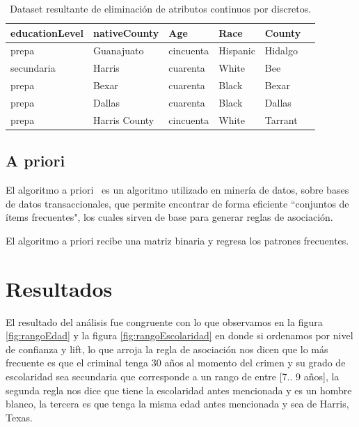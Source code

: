 \documentclass[sigconf]{acmart}
\begin{document}
\begin{table}[hbt]
\begin{center}
\begin{tabular}{llllll}
\toprule
educationLevel &   nativeCounty &        Age &      Race &   County \\
\midrule
         prepa &     Guanajuato &  cincuenta &  Hispanic &  Hidalgo \\
     secundaria &         Harris &   cuarenta &     White &      Bee \\
         prepa &          Bexar &   cuarenta &     Black &    Bexar \\
         prepa &         Dallas &   cuarenta &     Black &   Dallas \\
        prepa &  Harris County &  cincuenta &     White &  Tarrant \\
\bottomrule
\end{tabular}
\label{categorias}
\caption{Dataset resultante de eliminación de atributos continuos por discretos.}
\end{center}
\end{table}

\subsection{A priori} 
El algoritmo a priori~\cite{Raschka-rules} es un algoritmo utilizado en minería de datos, sobre bases de datos transaccionales, que permite encontrar de forma eficiente ``conjuntos de ítems frecuentes", los cuales sirven de base para generar reglas de asociación.

El algoritmo a priori recibe una matriz binaria y regresa los patrones frecuentes.


\section{Resultados}
El resultado del análisis fue congruente con lo que observamos en la figura \ref{fig:rangoEdad} y la figura \ref{fig:rangoEscolaridad} en donde si ordenamos por nivel de confianza y lift, lo que arroja la regla de asociación nos dicen que lo más frecuente es que el criminal tenga 30 años al momento del crimen y su grado de escolaridad sea secundaria que corresponde a un rango de entre [7.. 9 años], la segunda regla nos dice que tiene la escolaridad antes mencionada y es un hombre blanco, la tercera es que tenga la misma edad antes mencionada y sea de Harris, Texas.
\end{document}
